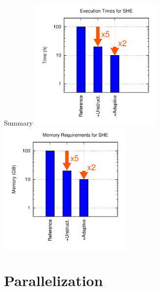 \documentclass[usepdftitle=false,10pt]{beamer}
\begin{document}
\begin{frame}{Summary}
  \includegraphics[width=0.49\textwidth]{summary-exec-3}
  \includegraphics[width=0.49\textwidth]{summary-memory-3}
\end{frame}


%
%

\section{Parallelization}

% 
\end{document}
